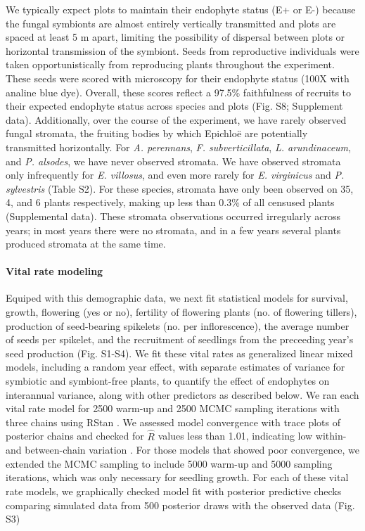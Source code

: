 \documentclass[12pt]{article}
\begin{document}
We typically expect plots to maintain their endophyte status (E+ or E-) because the fungal symbionts are almost entirely vertically transmitted and plots are {\color{red}spaced at least 5 m apart}, limiting the possibility of dispersal between plots or horizontal transmission of the symbiont. 
Seeds from reproductive individuals were taken opportunistically from reproducing plants throughout the experiment. 
These seeds were scored with microscopy for their endophyte status  (100X with analine blue dye).  
Overall, these scores reflect a 97.5\% faithfulness of recruits to their expected endophyte status across species and plots (Fig. S8; Supplement data). 
Additionally, over the course of the experiment, we have rarely observed fungal stromata, the fruiting bodies by which Epichlo\"e are potentially transmitted horizontally. 
For \emph{A. perennans}, \emph{F. subverticillata}, \emph{L. arundinaceum}, and \emph{P. alsodes}, we have never observed stromata. 
We have observed stromata only infrequently for \emph{E. villosus}, and even more rarely for \emph{E. virginicus} and \emph{P. sylvestris} (Table S2). 
For these species, stromata have only been observed on 35, 4, and 6 plants respectively, making up less than 0.3\% of all censused plants (Supplemental data).
These stromata observations occurred irregularly across years; in most years there were no stromata, and in a few years several plants produced stromata at the same time. 

\paragraph*{Vital rate modeling}
Equiped with this demographic data, we next fit statistical models for survival, growth, flowering (yes or no), fertility of flowering plants (no. of flowering tillers),  production of seed-bearing spikelets (no. per inflorescence), the average number of seeds per spikelet, and the recruitment of seedlings from the preceeding year's seed production (Fig. S1-S4).  
We fit these vital rates as generalized linear mixed models, including a random year effect, with separate estimates of variance for symbiotic and symbiont-free plants, to quantify the effect of endophytes on interannual variance, along with other predictors as described below.
We ran each vital rate model for 2500 warm-up and 2500 MCMC sampling iterations with three chains using RStan \cite{rstan2022}. 
We assessed model convergence with trace plots of posterior chains and checked for $\hat{R}$ values less than 1.01, indicating low within- and between-chain variation \cite{brooks1998general,gelman2006data}. 
For those models that showed poor convergence, we extended the MCMC sampling to include 5000 warm-up and 5000 sampling iterations, which was only necessary for seedling growth. 
For each of these vital rate models, we graphically checked model fit with posterior predictive checks comparing simulated data from 500 posterior draws with the observed data (Fig. S3)
\end{document}
